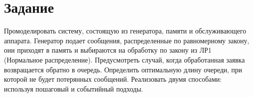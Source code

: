 \chapter{Задание}

Промоделировать систему, состоящую из генератора, памяти и обслуживающего аппарата.
Генератор подает сообщения, распределенные по равномерному закону, они приходят в память и выбираются на обработку по закону из ЛР1 (Нормальное распределение).
Предусмотреть случай, когда обработанная заявка возвращается обратно в очередь.
Определить оптимальную длину очереди, при которой не будет потерянных сообщений.
Реализовать двумя способами: используя пошаговый и событийный подходы.

